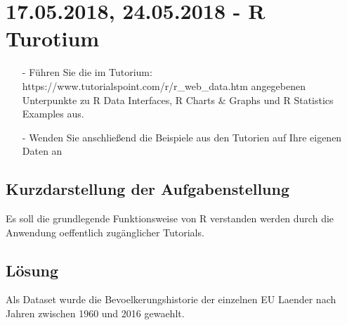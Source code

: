 \section{17.05.2018, 24.05.2018 - R Turotium}
\begin{itemize}
\item[-]Führen Sie die im Tutorium: https://www.tutorialspoint.com/r/r\_web\_data.htm angegebenen Unterpunkte zu R Data Interfaces, R Charts \& Graphs und R Statistics Examples aus.
\item[-]Wenden Sie anschließend die Beispiele aus den Tutorien auf Ihre eigenen Daten an
\end{itemize}

\subsection*{Kurzdarstellung der Aufgabenstellung}
Es soll die grundlegende Funktionsweise von R verstanden werden durch die Anwendung oeffentlich zugänglicher Tutorials.

\subsection*{Lösung}
Als Dataset wurde die Bevoelkerungshistorie der einzelnen EU Laender nach Jahren zwischen 1960 und 2016 gewaehlt. 

